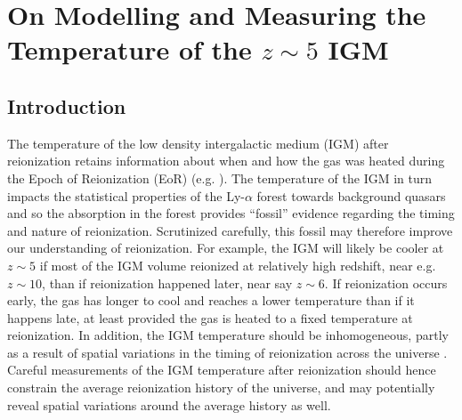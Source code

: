 

\ifpdf
    \graphicspath{{igm_temperature/figures/PNG/}{bubble_finding/figures/PDF/}{bubble_finding/figures/}}
\else
    \graphicspath{{igm_temperature/figures/EPS/}{example_chapter/figures/}}
\fi


\chapter{On Modelling and Measuring the Temperature of the $z \sim 5$ IGM}

\section{Introduction} \label{sec:intro}

The temperature of the low density intergalactic medium (IGM) after reionization retains information about
when and how the gas was heated during the Epoch of Reionization (EoR) (e.g. \citealt{1994MNRAS.266..343M,Hui:1997dp,Theuns:2002yc,Hui:2003hn}).
The temperature of the IGM in turn
impacts the statistical properties of the Ly-$\alpha$ forest towards background quasars and so the absorption in the
forest provides ``fossil'' evidence regarding the timing and nature of reionization. Scrutinized carefully, this
fossil may therefore improve our understanding of reionization. For example, the IGM will likely be cooler at $z \sim 5$ if most of the IGM volume
reionized at relatively high redshift, near e.g. $z \sim 10$, than if reionization happened later, near say $z \sim 6$. If reionization occurs
early, the gas has longer to cool and reaches a lower temperature than if it happens late, at least provided the gas is heated to a fixed
temperature at reionization. In addition, the IGM temperature should be inhomogeneous, partly as a result of spatial
variations in the timing of reionization across the universe \citep{Trac:2008yz,Cen:2009bg,Furlanetto:2009kr}. Careful measurements of the IGM temperature after reionization should hence
constrain the average reionization history of the universe, and may potentially reveal spatial variations around the average 
history as well.

